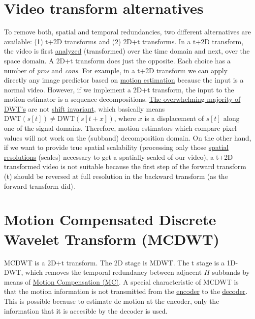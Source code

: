 \section{Video transform alternatives}
To remove both, spatial and temporal redundancies, two different
alternatives are available: (1) t+2D transforms and (2) 2D+t
transforms. In a t+2D transform, the video is first
\href{https://en.wikipedia.org/wiki/Digital_filter\#Analysis_techniques}{analyzed}
(transformed) over the time domain and next, over the space domain. A
2D+t transform does just the opposite. Each choice has a number of
\emph{pros} and \emph{cons}. For example, in a t+2D transform we can
apply directly any image predictor based on
\href{https://en.wikipedia.org/wiki/Motion_estimation}{motion
  estimation} because the input is a normal video. However, if we
implement a 2D+t transform, the input to the motion estimator is a
sequence decompositions.
\href{http://www.polyvalens.com/blog/wavelets/theory}{The overwhelming
  majority of DWT's} are not
\href{http://www.polyvalens.com/blog/wavelets/theory}{shift
  invariant}, which basically means $\text{DWT}(s[t]) \neq
\text{DWT}(s[t+x])$, where $x$ is a displacement of $s[t]$ along one of the
signal domains.  Therefore, motion estimators which compare pixel values
will not work on the (subband) decomposition domain. On the other
hand, if we want to provide true spatial scalability (processing only
those
\href{https://www.tutorialspoint.com/dip/spatial_resolution.htm}{spatial
  resolutions} (scales) necessary to get a spatially scaled of our
video), a t+2D transformed video is not suitable because the first
step of the forward transform (t) should be reversed at full
resolution in the backward transform (as the forward transform did).

\section{Motion Compensated Discrete Wavelet Transform (MCDWT)}
MCDWT is a 2D+t transform. The 2D stage is MDWT. The t stage is a
1D-DWT, which removes the temporal redundancy between adjacent $H$
subbands by means of
\href{https://en.wikipedia.org/wiki/Motion_compensation}{Motion
  Compensation (MC)}. A special characteristic of MCDWT is that the
motion information is not transmitted from the
\href{https://en.wikipedia.org/wiki/Encoder}{encoder} to the
\href{https://en.wikipedia.org/wiki/Decoder}{decoder}. This is
possible because to estimate de motion at the encoder, only the
information that it is accesible by the decoder is used.

